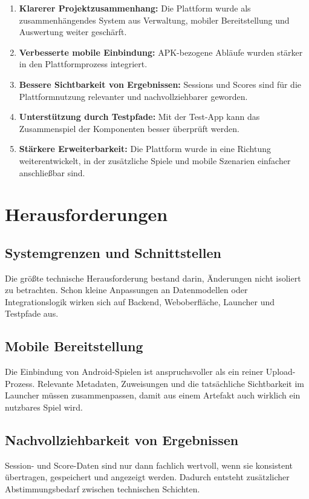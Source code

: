 \documentclass[12pt,a4paper]{article}
\begin{document}
\begin{enumerate}[leftmargin=1.5em]
  \item \textbf{Klarerer Projektzusammenhang:} Die Plattform wurde als zusammenhängendes System aus Verwaltung, mobiler Bereitstellung und Auswertung weiter geschärft.
  \item \textbf{Verbesserte mobile Einbindung:} APK-bezogene Abläufe wurden stärker in den Plattformprozess integriert.
  \item \textbf{Bessere Sichtbarkeit von Ergebnissen:} Sessions und Scores sind für die Plattformnutzung relevanter und nachvollziehbarer geworden.
  \item \textbf{Unterstützung durch Testpfade:} Mit der Test-App kann das Zusammenspiel der Komponenten besser überprüft werden.
  \item \textbf{Stärkere Erweiterbarkeit:} Die Plattform wurde in eine Richtung weiterentwickelt, in der zusätzliche Spiele und mobile Szenarien einfacher anschließbar sind.
\end{enumerate}

\section{Herausforderungen}
\subsection*{Systemgrenzen und Schnittstellen}
Die größte technische Herausforderung bestand darin, Änderungen nicht isoliert zu betrachten. Schon kleine Anpassungen an Datenmodellen oder Integrationslogik wirken sich auf Backend, Weboberfläche, Launcher und Testpfade aus.

\subsection*{Mobile Bereitstellung}
Die Einbindung von Android-Spielen ist anspruchsvoller als ein reiner Upload-Prozess. Relevante Metadaten, Zuweisungen und die tatsächliche Sichtbarkeit im Launcher müssen zusammenpassen, damit aus einem Artefakt auch wirklich ein nutzbares Spiel wird.

\subsection*{Nachvollziehbarkeit von Ergebnissen}
Session- und Score-Daten sind nur dann fachlich wertvoll, wenn sie konsistent übertragen, gespeichert und angezeigt werden. Dadurch entsteht zusätzlicher Abstimmungsbedarf zwischen technischen Schichten.
\end{document}
